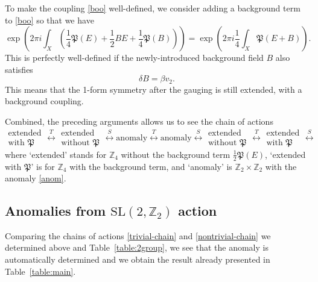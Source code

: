 \documentclass[12pt]{article}
\numberwithin{equation}{section}
\def\bZ{\mathbb{Z}}
\def\SL{\mathrm{SL}}
\begin{document}
To make  the coupling \eqref{boo}  well-defined, we consider adding a background term to \eqref{boo} so that we have \begin{equation}
\exp\left(2\pi i\int_X ( \frac14 \mathfrak{P}(E) +\frac12 B E + \frac14 \mathfrak{P}(B) )\right)
= 
\exp \left(2\pi i \frac14 \int_X \mathfrak{P}(E+B)\right) .
\end{equation}
This is perfectly well-defined if the newly-introduced background field $B$  also satisfies \begin{equation}
\delta B=\beta v_2.
\end{equation}
This means that the 1-form symmetry after the gauging is still extended, with a background coupling.

\def\ewith{
\begin{array}{c}
\text{extended}\\
\text{with $\mathfrak{P}$} 
\end{array} 
}
\def\ewithout{
\begin{array}{c}
\text{extended}\\
\text{without $\mathfrak{P}$} 
\end{array} 
}
Combined, the preceding arguments allows us to  see the chain of actions \begin{equation}
\ewith \stackrel{T}{\longleftrightarrow} 
\ewithout \stackrel{S}{\longleftrightarrow} 
\text{anomaly} \stackrel{T}{\longleftrightarrow} 
\text{anomaly} \stackrel{S}{\longleftrightarrow} 
\ewithout \stackrel{T}{\longleftrightarrow} 
\ewith \stackrel{S}{\longleftrightarrow} 
\label{nontrivial-chain}
\end{equation}
where `extended' stands for $\bZ_4$ without the background term $\frac12\mathfrak{P}(E)$,
`extended with $\mathfrak{P}$' is for $\bZ_4$ with the background term,
and `anomaly' is $\bZ_2\times \bZ_2$ with the anomaly \eqref{anom}.


\subsection{Anomalies from $\SL(2,\bZ_2)$ action} 
Comparing the chains of actions \eqref{trivial-chain} and \eqref{nontrivial-chain} we determined above 
and Table~\ref{table:2group},
we see that the anomaly is automatically determined and 
we obtain the result already presented in Table~\ref{table:main}.
\end{document}
